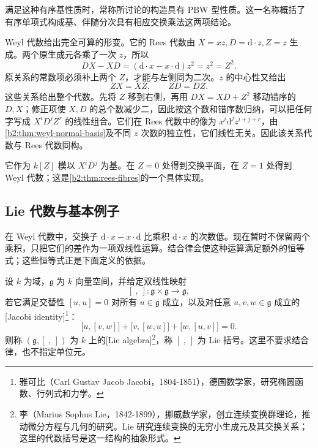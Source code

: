 满足这种有序基性质时，常称所讨论的构造具有 PBW 型性质。这一名称概括了有序单项式构成基、伴随分次具有相应交换乘法这两项结论。

\ProseParagraphBreak
Weyl 代数给出完全可算的形变。它的 Rees 代数由 \(X=xz,D=\mathrm{d}\cdot z,Z=z\) 生成。两个原生成元各乘了一次 \(z\)，所以
\[
	DX-XD=(\mathrm{d}\cdot x-x\cdot\mathrm{d})z^2=z^2=Z^2.
\]
原关系的常数项必须补上两个 \(Z\)，才能与左侧同为二次。\(z\) 的中心性又给出
\[
	ZX=XZ,\qquad ZD=DZ.
\]
这些关系给出整个代数。先将 \(Z\) 移到右侧，再用 \(DX=XD+Z^2\) 移动错序的 \(D,X\)；修正项使 \(X,D\) 的总个数减少二，因此按这个数和错序数归纳，可以把任何字写成 \(X^iD^jZ^r\) 的线性组合。它们在 Rees 代数中的像为 \(x^i\mathrm{d}^jz^{i+j+r}\)，由\cref{b2:thm:weyl-normal-basis}及不同 \(z\) 次数的独立性，它们线性无关。因此该关系代数与 Rees 代数同构。

\ProseParagraphBreak
它作为 \(k[Z]\) 模以 \(X^iD^j\) 为基。在 \(Z=0\) 处得到交换平面，在 \(Z=1\) 处得到 Weyl 代数；这是\cref{b2:thm:rees-fibres}的一个具体实现。

\subsection{Lie 代数与基本例子}
\label{b2:subsec:2004:lie-basics}

在 Weyl 代数中，交换子 \(\mathrm{d}\cdot x-x\cdot\mathrm{d}\) 比乘积 \(\mathrm{d}\cdot x\) 的次数低。现在暂时不保留两个乘积，只把它们的差作为一项双线性运算。结合律会使这种运算满足额外的恒等式；这些恒等式正是下面定义的依据。

\begin{definition}\label{b2:def:lie-algebra}
	设 \(k\) 为域，\(\mathfrak g\) 为 \(k\) 向量空间，并给定双线性映射
	\[
		[\ ,\ ]:\mathfrak g\times\mathfrak g\longrightarrow\mathfrak g,
	\]
	若它满足交替性 \([u,u]=0\) 对所有 \(u\in\mathfrak g\) 成立，以及对任意 \(u,v,w\in\mathfrak g\) 成立的[Jacobi identity]\footnote{雅可比（Carl Gustav Jacob Jacobi，1804-1851），德国数学家，研究椭圆函数、行列式和力学。}：
	\begin{equation}\label{b2:eq:lie-jacobi}
		\bigl[u,[v,w]\bigr]+\bigl[v,[w,u]\bigr]+\bigl[w,[u,v]\bigr]=0.
	\end{equation}
	则称 \((\mathfrak g,[\ ,\ ])\) 为 \(k\) 上的[Lie algebra]\footnote{李（Marius Sophus Lie，1842-1899），挪威数学家，创立连续变换群理论，推动微分方程与几何的研究。Lie 研究连续变换的无穷小生成元及其交换关系；这里的代数括号是这一结构的抽象形式。}，称 \([\ ,\ ]\) 为 Lie 括号。这里不要求结合律，也不指定单位元。
\end{definition}

